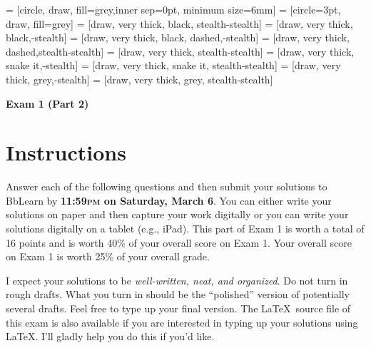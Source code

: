 \documentclass[11pt]{article}
\theoremstyle{definition}
\begin{document}
 = [circle, draw, fill=grey,inner sep=0pt, minimum size=6mm]
 = [circle=3pt, draw, fill=grey]
 = [draw, very  thick, black, stealth-stealth]
 = [draw, very  thick, black,-stealth]
 = [draw, very  thick, black, dashed,-stealth]
 = [draw, very thick, dashed,stealth-stealth]
 = [draw, very thick, stealth-stealth]
 = [draw, very thick, snake it,-stealth]
 = [draw, very thick, snake it, stealth-stealth]
 = [draw, very thick, grey,-stealth]
 = [draw, very thick, grey, stealth-stealth]

\begin{center}

{\Large\bf Exam 1 (Part 2)}

\bigskip

  
  \bigskip
  

\end{center}

\section*{Instructions}

Answer each of the following questions and then submit your solutions to BbLearn by \textbf{11:59\textsc{pm} on Saturday, March 6}. You can either write your solutions on paper and then capture your work digitally or you can write your solutions digitally on a tablet (e.g., iPad). This part of Exam 1 is worth a total of 16 points and is worth 40\% of your overall score on Exam 1. Your overall score on Exam 1 is worth 25\% of your overall grade.

\bigskip

I expect your solutions to be \emph{well-written, neat, and organized}.  Do not turn in rough drafts.  What you turn in should be the ``polished'' version of potentially several drafts.  Feel free to type up your final version.  The \LaTeX\ source file of this exam is also available if you are interested in typing up your solutions using \LaTeX.  I'll gladly help you do this if you'd like.
\end{document}
